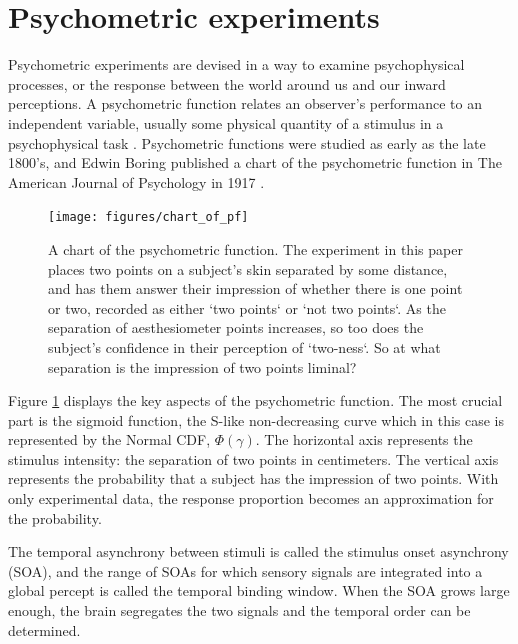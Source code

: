 \documentclass[11pt, oneside, openany]{scrbook}
\begin{document}
\hypertarget{psycho-experiments}{%
\section{Psychometric experiments}\label{psycho-experiments}}

Psychometric experiments are devised in a way to examine psychophysical processes, or the response between the world around us and our inward perceptions. A psychometric function relates an observer's performance to an independent variable, usually some physical quantity of a stimulus in a psychophysical task \citep{wichmann2001a}. Psychometric functions were studied as early as the late 1800's, and Edwin Boring published a chart of the psychometric function in The American Journal of Psychology in 1917 \citep{boring1917chart}.

\begin{figure}

{\centering \texttt{[image: figures/chart\_of\_pf]} 

}

\caption{A chart of the psychometric function. The experiment in this paper places two points on a subject's skin separated by some distance, and has them answer their impression of whether there is one point or two, recorded as either `two points` or `not two points`. As the separation of aesthesiometer points increases, so too does the subject's confidence in their perception of `two-ness`. So at what separation is the impression of two points liminal?}\label{fig:ch020-chart-of-pf}
\end{figure}

Figure \ref{fig:ch020-chart-of-pf} displays the key aspects of the psychometric function. The most crucial part is the sigmoid function, the S-like non-decreasing curve which in this case is represented by the Normal CDF, \(\Phi(\gamma)\). The horizontal axis represents the stimulus intensity: the separation of two points in centimeters. The vertical axis represents the probability that a subject has the impression of two points. With only experimental data, the response proportion becomes an approximation for the probability.

The temporal asynchrony between stimuli is called the stimulus onset asynchrony (SOA), and the range of SOAs for which sensory signals are integrated into a global percept is called the temporal binding window. When the SOA grows large enough, the brain segregates the two signals and the temporal order can be determined.
\end{document}
